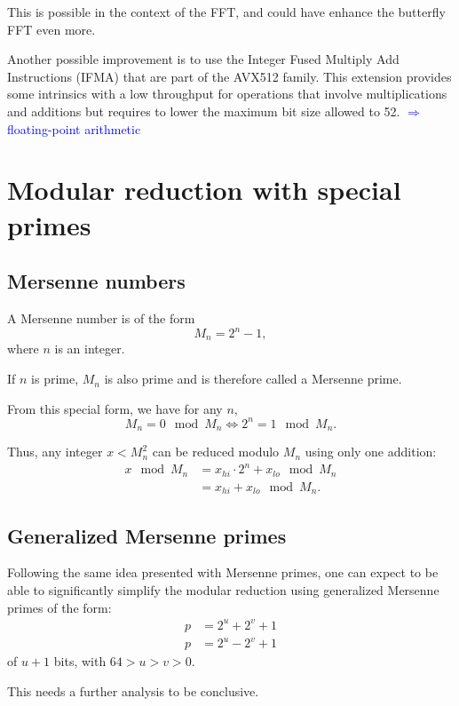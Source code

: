 \documentclass[a4paper]{article}
\begin{document}
This is possible in the context of the FFT, and could have enhance the butterfly FFT even more.

\bigskip
Another possible improvement is to use the Integer Fused Multiply Add Instructions (IFMA) that are part of
the AVX512 family. This extension provides some intrinsics with a low throughput for operations that involve
multiplications and additions but requires to lower the maximum bit size allowed to 52. \textcolor{blue}{$\Rightarrow$floating-point arithmetic}


\newpage
 
 
\nocite{*}


\newpage
\appendix
\section{Modular reduction with special primes} \label{app}

\subsection{Mersenne numbers}

\begin{definition}
    A Mersenne number is of the form $$ M_n = 2^n-1,$$ where $n$ is an integer.

    If $n$ is prime, $M_n$ is also prime and is therefore called a Mersenne prime.
\end{definition}

From this special form, we have for any $n$,
\[
M_n = 0 \mod M_n \Longleftrightarrow 2^n = 1 \mod M_n.
\]

Thus, any integer $x < M_n^2$ can be reduced modulo $M_n$ using only one addition: 
\begin{align*}
x \mod M_n &= x_{hi}\cdot 2^{n} + x_{lo} \mod M_n \\
    &= x_{hi} + x_{lo} \mod M_n.
\end{align*}


\subsection{Generalized Mersenne primes}

Following the same idea presented with Mersenne primes, one can expect to be able to significantly simplify
the modular reduction using generalized Mersenne primes of the form:
\begin{align*}
    p &= 2^u + 2^v + 1 \\ 
    p &= 2^u - 2^v + 1 
\end{align*}
of $u+1$ bits, with $64 > u > v > 0$.

This needs a further analysis to be conclusive.
\end{document}
